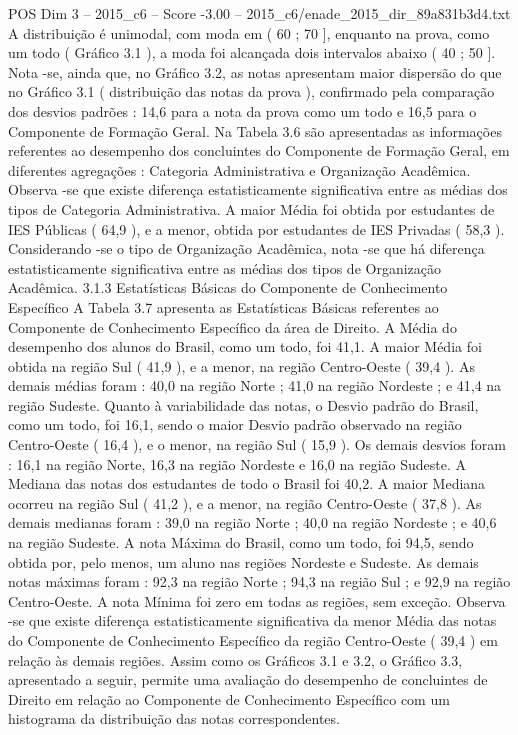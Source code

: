 \begin{textsample}{POS Dim 3 – 2015\_c6 – Score -3.00 – 2015\_c6/enade\_2015\_dir\_89a831b3d4.txt}
A distribuição é unimodal, com moda em ( 60 ; 70 ], enquanto na prova, como um todo ( Gráfico 3.1 ), a moda foi alcançada dois intervalos abaixo ( 40 ; 50 ].
Nota -se, ainda que, no Gráfico 3.2, as notas apresentam maior dispersão do que no Gráfico 3.1 ( distribuição das notas da prova ), confirmado pela comparação dos desvios padrões : 14,6 para a nota da prova como um todo e 16,5 para o Componente de Formação Geral.
Na Tabela 3.6 são apresentadas as informações referentes ao desempenho dos concluintes do Componente de Formação Geral, em diferentes agregações : Categoria Administrativa e Organização Acadêmica.
Observa -se que existe diferença estatisticamente significativa entre as médias dos tipos de Categoria Administrativa.
A maior Média foi obtida por estudantes de IES Públicas ( 64,9 ), e a menor, obtida por estudantes de IES Privadas ( 58,3 ).
Considerando -se o tipo de Organização Acadêmica, nota -se que há diferença estatisticamente significativa entre as médias dos tipos de Organização Acadêmica. 3.1.3 Estatísticas Básicas do Componente de Conhecimento Específico A Tabela 3.7 apresenta as Estatísticas Básicas referentes ao Componente de Conhecimento Específico da área de Direito.
A Média do desempenho dos alunos do Brasil, como um todo, foi 41,1.
A maior Média foi obtida na região Sul ( 41,9 ), e a menor, na região Centro-Oeste ( 39,4 ).
As demais médias foram : 40,0 na região Norte ; 41,0 na região Nordeste ; e 41,4 na região Sudeste.
Quanto à variabilidade das notas, o Desvio padrão do Brasil, como um todo, foi 16,1, sendo o maior Desvio padrão observado na região Centro-Oeste ( 16,4 ), e o menor, na região Sul ( 15,9 ).
Os demais desvios foram : 16,1 na região Norte, 16,3 na região Nordeste e 16,0 na região Sudeste.
A Mediana das notas dos estudantes de todo o Brasil foi 40,2.
A maior Mediana ocorreu na região Sul ( 41,2 ), e a menor, na região Centro-Oeste ( 37,8 ).
As demais medianas foram : 39,0 na região Norte ; 40,0 na região Nordeste ; e 40,6 na região Sudeste.
A nota Máxima do Brasil, como um todo, foi 94,5, sendo obtida por, pelo menos, um aluno nas regiões Nordeste e Sudeste.
As demais notas máximas foram : 92,3 na região Norte ; 94,3 na região Sul ; e 92,9 na região Centro-Oeste.
A nota Mínima foi zero em todas as regiões, sem exceção.
Observa -se que existe diferença estatisticamente significativa da menor Média das notas do Componente de Conhecimento Específico da região Centro-Oeste ( 39,4 ) em relação às demais regiões.
Assim como os Gráficos 3.1 e 3.2, o Gráfico 3.3, apresentado a seguir, permite uma avaliação do desempenho de concluintes de Direito em relação ao Componente de Conhecimento Específico com um histograma da distribuição das notas correspondentes.

\end{textsample}
